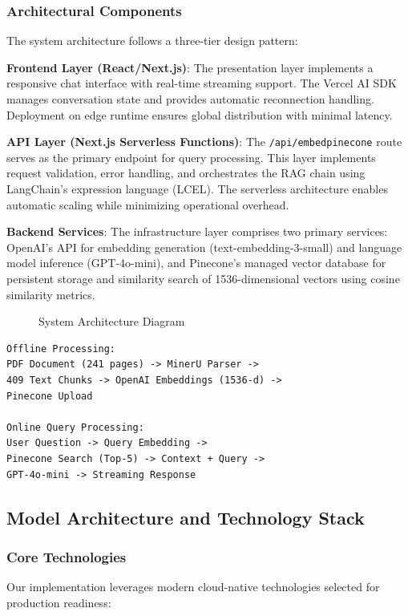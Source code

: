 \documentclass[conference]{IEEEtran}
\begin{document}
\subsubsection{Architectural Components}

The system architecture follows a three-tier design pattern:

\textbf{Frontend Layer (React/Next.js)}: The presentation layer implements a responsive chat interface with real-time streaming support. The Vercel AI SDK manages conversation state and provides automatic reconnection handling. Deployment on edge runtime ensures global distribution with minimal latency.

\textbf{API Layer (Next.js Serverless Functions)}: The \texttt{/api/embedpinecone} route serves as the primary endpoint for query processing. This layer implements request validation, error handling, and orchestrates the RAG chain using LangChain's expression language (LCEL). The serverless architecture enables automatic scaling while minimizing operational overhead.

\textbf{Backend Services}: The infrastructure layer comprises two primary services: OpenAI's API for embedding generation (text-embedding-3-small) and language model inference (GPT-4o-mini), and Pinecone's managed vector database for persistent storage and similarity search of 1536-dimensional vectors using cosine similarity metrics.

\begin{figure}[htbp]
\centerline{}
\caption{System Architecture Diagram}
\label{fig:architecture}
\end{figure}

\begin{verbatim}
Offline Processing:
PDF Document (241 pages) -> MinerU Parser -> 
409 Text Chunks -> OpenAI Embeddings (1536-d) -> 
Pinecone Upload

Online Query Processing:
User Question -> Query Embedding -> 
Pinecone Search (Top-5) -> Context + Query -> 
GPT-4o-mini -> Streaming Response
\end{verbatim}

\subsection{Model Architecture and Technology Stack}

\subsubsection{Core Technologies}
Our implementation leverages modern cloud-native technologies selected for production readiness:
\end{document}

